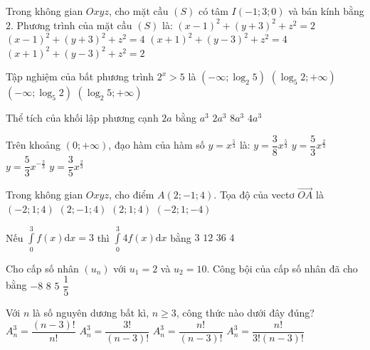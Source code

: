 \begin{ex}%
Trong không gian $O x y z$, cho mặt cầu $(S)$ có tâm $I(-1; 3; 0)$ và bán kính bằng $2$. Phương trình của mặt cầu $(S)$ là:
\choice
{$(x-1)^2+(y+3)^2+z^2=2$}
{$(x-1)^2+(y+3)^2+z^2=4$}
{\True $(x+1)^2+(y-3)^2+z^2=4$}
{$(x+1)^2+(y-3)^2+z^2=2$}

\end{ex}
\begin{ex}%
Tập nghiệm của bất phương trình $2^{x}>5$ là
\choice
{$\left(-\infty; \log_2 5\right)$}
{$\left(\log_5 2;+\infty\right)$}
{$\left(-\infty; \log_5 2\right)$}
{\True $\left(\log_2 5;+\infty\right)$}

\end{ex}
\begin{ex}%
Thể tích của khối lập phương cạnh $2a$ bằng
\choice
{$a^3$}
{$2 a^3$}
{\True $8 a^3$}
{$4 a^3$}

\end{ex}
\begin{ex}%
Trên khoảng $(0;+\infty)$, đạo hàm của hàm số $y=x^{\frac{5}{3}}$ là:
\choice
{$y=\dfrac{3}{8} x^{\frac{5}{3}}$}
{\True $y=\dfrac{5}{3} x^{\frac{2}{3}}$}
{$y=\dfrac{5}{3} x^{-\frac{2}{3}}$}
{$y=\dfrac{3}{5} x^{\frac{2}{3}}$}

\end{ex}
\begin{ex}%
Trong không gian $O x y z$, cho điểm $A(2;-1; 4)$. Tọa độ của vectơ $\overrightarrow{OA}$ là
\choice
{$(-2; 1; 4)$}
{\True $(2;-1; 4)$}
{$(2; 1; 4)$}
{$(-2; 1;-4)$}

\end{ex}
\begin{ex}%
Nếu $\displaystyle\int\limits_0^3 f(x) \mathrm{d} x=3$ thì $\displaystyle\int\limits_0^3 4 f(x) \mathrm{d} x$ bằng
\choice
{$3$}
{\True $12$}
{$36$}
{$4$}

\end{ex}
\begin{ex}%
Cho cấp số nhân $\left(u_n\right)$ với $u_1=2$ và $u_2=10$. Công bội của cấp số nhân đã cho bằng
\choice
{$-8$}
{$8$}
{\True $5$}
{$\dfrac{1}{5}$}

\end{ex}
\begin{ex}%
Với $n$ là số nguyên dương bất kì, $n \geq 3$, công thức nào dưới đây đúng?
\choice
{$A_n^3=\dfrac{(n-3) !}{n !}$}
{$A_n^3=\dfrac{3!}{(n-3) !}$}
{\True $A_n^3=\dfrac{n !}{(n-3) !}$}
{$A_n^3=\dfrac{n !}{3!(n-3) !}$}

\end{ex}
